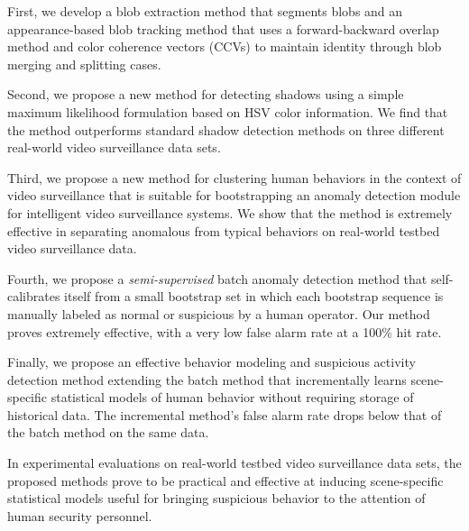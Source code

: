 First, we develop a blob extraction method that segments blobs and an
appearance-based blob tracking method that uses a forward-backward
overlap method and color coherence vectors (CCVs) to maintain identity
through blob merging and splitting cases.

Second, we propose a new method for detecting shadows using a simple
maximum likelihood formulation based on HSV color information. We find
that the method outperforms standard shadow detection methods on three
different real-world video surveillance data sets.

Third, we propose a new method for clustering human behaviors in the
context of video surveillance that is suitable for bootstrapping an
anomaly detection module for intelligent video surveillance
systems. We show that the method is extremely effective in separating
anomalous from typical behaviors on real-world testbed video
surveillance data.

Fourth, we propose a \textit{semi-supervised} batch anomaly
detection method that self-calibrates itself from a small bootstrap
set in which each bootstrap sequence is manually labeled as normal or
suspicious by a human operator. Our method proves extremely effective,
with a very low false alarm rate at a 100\% hit rate.

Finally, we propose an effective behavior modeling and suspicious
activity detection method extending the batch method that
incrementally learns scene-specific statistical models of human
behavior without requiring storage of historical data. The incremental
method's false alarm rate drops below that of the batch method on the
same data.

In experimental evaluations on real-world testbed video surveillance
data sets, the proposed methods prove to be practical and effective at
inducing scene-specific statistical models useful for bringing
suspicious behavior to the attention of human security personnel.

\setlength{\parskip}{0pt} 
\newpage
{}
\tableofcontents


\newpage
{}
\listoffigures


